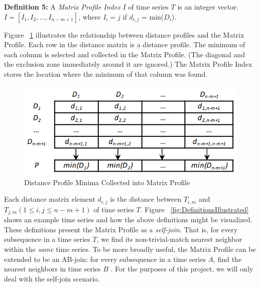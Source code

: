 \documentclass[conference]{IEEEtran}
\begin{document}
\textbf{Definition 5:} A \emph{Matrix Profile Index} $I$ of time series $T$ is an integer vector: $I = [I_1, I_2, \ldots{}, I_{n-m+1}]$, where $I_i = j$ if $d_{i,j}$ = min($D_i$).

Figure ~\ref{fig:DistanceProfilesIntoMatrixProfile} illustrates the relationship between distance profiles and the Matrix Profile.  Each row in the distance matrix is a distance profile.  The minimum of each column is selected and collected in the Matrix Profile.  (The diagonal and the exclusion zone immediately around it are ignored.)  The Matrix Profile Index stores the location where the minimum of that column was found\cite{MatrixProfile14}.

\begin{figure}
\begin{center}
\includegraphics[scale=0.40]{distance_profiles_into_matrix_profile.png}
\caption{Distance Profile Minima Collected into Matrix Profile}
\label{fig:DistanceProfilesIntoMatrixProfile}
\end{center}
\end{figure}

Each distance matrix element $d_{i,j}$ is the distance between $T_{i,m}$ and $T_{j,m} (1 \leq i, j \leq n-m+1)$ of time series $T$.  Figure ~\ref{fig:DefinitionsIllustrated} shows an example time series and how the above definitions might be visualized\cite{MatrixProfile11}.  These definitions present the Matrix Profile as a \emph{self-join}.  That is, for every subsequence in a time series $T$, we find its non-trivial-match nearest neighbor within the \emph{same} time series.  To be more broadly useful, the Matrix Profile can be extended to be an AB-join: for every subsequence in a time series $A$, find the nearest neighbors in time series $B$ \cite{MatrixProfile2}\cite{MatrixProfile14}.  For the purposes of this project, we will only deal with the self-join scenario.
\end{document}
